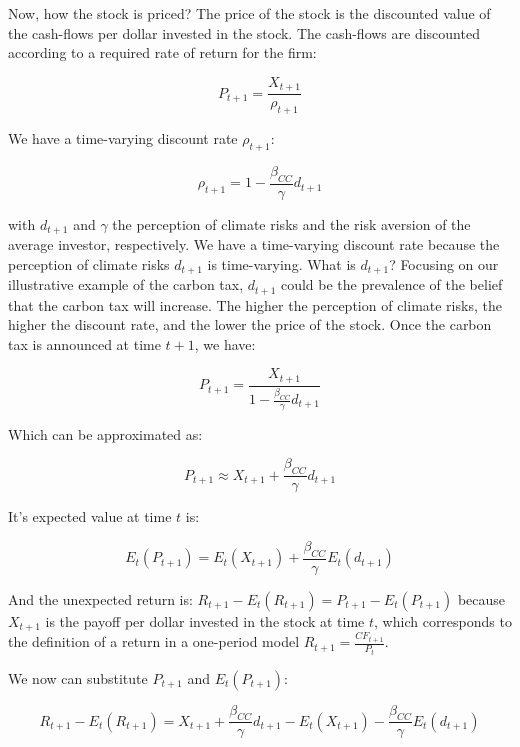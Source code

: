 Now, how the stock is priced? 
The price of the stock is the discounted value of the 
cash-flows per dollar invested in the stock.
The cash-flows are discounted according 
to a required rate of return for the firm:

\begin{equation}
    P_{t+1} = \frac{X_{t+1}}{\rho_{t+1}}
\end{equation}

We have a time-varying discount rate $\rho_{t+1}$:

\begin{equation}
    \rho_{t+1} = 1 - \frac{\beta_{CC}}{\gamma} d_{t+1}
\end{equation}

with $d_{t+1}$ and $\gamma$ the perception of climate 
risks and the risk aversion of the average investor, respectively.
We have a time-varying discount rate because
the perception of climate risks $d_{t+1}$ is time-varying.
What is $d_{t+1}$? Focusing on our illustrative 
example of the carbon tax, $d_{t+1}$ could be the
prevalence of the belief that the carbon tax will increase.
The higher the perception of climate risks, the higher
the discount rate, and the lower the price of the stock.
Once the carbon tax is announced at time $t+1$, we have:

\begin{equation}
    P_{t+1} = \frac{X_{t+1}}{1 - \frac{\beta_{CC}}{\gamma}d_{t+1}}
\end{equation}

Which can be approximated as:

\begin{equation}
    P_{t+1} \approx X_{t+1} + \frac{\beta_{CC}}{\gamma}d_{t+1}
\end{equation}

It's expected value at time $t$ is:

\begin{equation}
    E_t(P_{t+1}) = E_t(X_{t+1}) + \frac{\beta_{CC}}{\gamma}E_t(d_{t+1})
\end{equation}

And the unexpected return is:
$
    R_{t+1} - E_t(R_{t+1}) = P_{t+1} - E_t(P_{t+1})
$
because $X_{t+1}$ is the payoff per dollar invested in the stock at time $t$,
which corresponds to the definition of a return in a 
one-period model $R_{t+1} = \frac{CF_{t+1}}{P_t}$.

We now can substitute $P_{t+1}$ and $E_t(P_{t+1})$:

\begin{equation}
    R_{t+1} - E_t(R_{t+1}) = X_{t+1} + \frac{\beta_{CC}}{\gamma}d_{t+1} - E_t(X_{t+1}) - \frac{\beta_{CC}}{\gamma}E_t(d_{t+1})
\end{equation}

